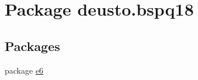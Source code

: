 \hypertarget{namespacedeusto_1_1bspq18}{}\section{Package deusto.\+bspq18}
\label{namespacedeusto_1_1bspq18}
\subsection*{Packages}
\begin{DoxyCompactItemize}
\item 
package \mbox{\hyperlink{namespacedeusto_1_1bspq18_1_1e6}{e6}}
\end{DoxyCompactItemize}
